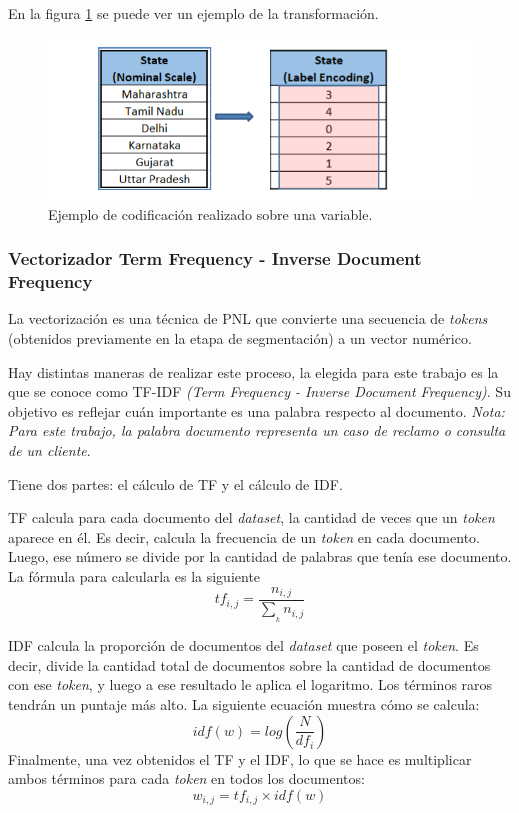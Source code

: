 En la figura \ref{fig:labelencoding} se puede ver un ejemplo de la transformación.

\begin{figure}[htbp]
	\centering
	\includegraphics[width=.8\textwidth]{./Figures/labelencoding.png}
	\caption{Ejemplo de codificación realizado sobre una variable\protect\footnotemark.}
	\label{fig:labelencoding}
\end{figure}


\subsubsection{Vectorizador Term Frequency - Inverse Document Frequency}

La vectorización es una técnica de PNL que convierte una secuencia de \textit{tokens} (obtenidos previamente en la etapa de segmentación) a un vector numérico.

Hay distintas maneras de realizar este proceso, la elegida para este trabajo es la que se conoce como TF-IDF \textit{(Term Frequency - Inverse Document Frequency)}. Su objetivo es reflejar cuán importante es una palabra respecto al documento. \textit{Nota: Para este trabajo, la palabra documento representa un caso de reclamo o consulta de un cliente}. 

Tiene dos partes: el cálculo de TF y el cálculo de IDF.

TF calcula para cada documento del \textit{dataset}, la cantidad de veces que un \textit{token} aparece en él. Es decir, calcula la frecuencia de un \textit{token} en cada documento. Luego, ese número se divide por la cantidad de palabras que tenía ese documento. 
La fórmula para calcularla es la siguiente \citep{WEBSITE:17}
\begin{equation}
tf_{i,j}= \frac{n_{i,j}}{\sum_{_{k}}^{}n_{i,j}}
\end{equation}

IDF calcula la proporción de documentos del \textit{dataset} que poseen el \textit{token}. Es decir, divide la cantidad total de documentos sobre la cantidad de documentos con ese \textit{token}, y luego a ese resultado le aplica el logaritmo. Los términos raros tendrán un puntaje más alto. 
La siguiente ecuación muestra cómo se calcula:
\begin{equation}
idf(w) = log(\frac{N}{df_{i}})
\end{equation}
Finalmente, una vez obtenidos el TF y el IDF, lo que se hace es multiplicar ambos términos para cada \textit{token} en todos los documentos:
\begin{equation}
w_{i,j} = tf_{i,j} \times idf(w)
\end{equation}

